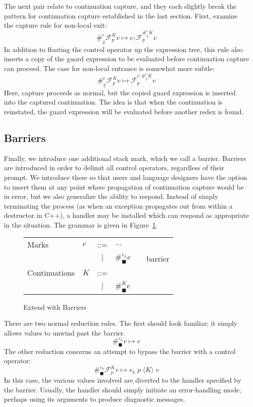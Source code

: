 \documentclass[11pt]{article}
\newcommand{\maybePage}{\newpage}
\newcommand\F{\mathcal{F}}
\newcommand{\angles}[1]{\langle#1\rangle}
\begin{document}
The next pair relate to continuation capture, and they each slightly break the pattern for continuation capture established in the last section.
First, examine the capture rule for non-local exit:
$$\#_{\Downarrow}^{e}\F_p^K v \mapsto e;\F_p^{\#_\Downarrow^{e}K}v$$
In addition to floating the control operator up the expression tree, this rule also inserts a copy of the guard expression to be evaluated before continuation capture can proceed.
The case for non-local entrance is somewhat more subtle:
$$\#_{\Uparrow}^{e}\F_p^K v \mapsto \F_p^{e;\#_\Uparrow^{e}K}v$$
Here, capture proceeds as normal, but the copied guard expression is inserted into the captured continuation.
The idea is that when the continuation is reinstated, the guard expression will be evaluated before another redex is found.

\maybePage
\subsection{Barriers}

Finally, we introduce one additional stack mark, which we call a barrier.
Barriers are introduced in order to delimit all control operators, regardless of their prompt.
We introduce these so that users and language designers have the option to insert them at any point where propagation of continuation capture would be in error, but we also generalize the ability to respond.
Instead of simply terminating the process (as when an exception propagates out from within a destructor in C++), a handler may be installed which can respond as appropriate in the situation.
The grammar is given in Figure~\ref{fig:addBarriers}.

\begin{figure}[H]
\caption{Extend with Barriers}
\label{fig:addBarriers}

\begin{tabular}{llclll}
Marks & $e$ & ::= & $\ldots$ &  \\
& & $|$ & $\#_\blacksquare^{e_h}e$ && barrier \\
Continuations & $K$ & ::= & \\
& & $|$ & $\#_{\blacksquare}^{K}e$ &&  \\
\end{tabular}
\end{figure}


There are two normal reduction rules.
The first should look familiar; it simply allows values to unwind past the barrier.
$$\#_\blacksquare^{v_h}v \mapsto v$$
The other reduction concerns an attempt to bypass the barrier with a control operator:
$$\#_\blacksquare^{v_h}\F_p^K v \mapsto v_h\;p\;\angles{K}\;v$$
In this case, the various values involved are diverted to the handler specified by the barrier.
Usually, the handler should simply initiate an error-handling mode, perhaps using its arguments to produce diagnostic messages.
\end{document}
